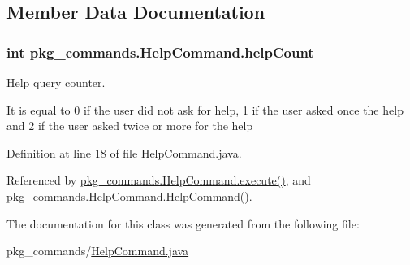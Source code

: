 \subsection{Member Data Documentation}
\hypertarget{classpkg__commands_1_1HelpCommand_a1f83dd0f92e63803f29ce29485903526}{
\subsubsection[{help\-Count}]{\setlength{\rightskip}{0pt plus 5cm}int pkg\-\_\-commands.\-Help\-Command.\-help\-Count\hspace{0.3cm}{\ttfamily [private]}}}\label{classpkg__commands_1_1HelpCommand_a1f83dd0f92e63803f29ce29485903526}


Help query counter. 

It is equal to 0 if the user did not ask for help, 1 if the user asked once the help and 2 if the user asked twice or more for the help 

Definition at line \hyperlink{HelpCommand_8java_source_l00018}{18} of file \hyperlink{HelpCommand_8java_source}{Help\-Command.\-java}.



Referenced by \hyperlink{HelpCommand_8java_source_l00033}{pkg\-\_\-commands.\-Help\-Command.\-execute()}, and \hyperlink{HelpCommand_8java_source_l00023}{pkg\-\_\-commands.\-Help\-Command.\-Help\-Command()}.



The documentation for this class was generated from the following file\-:\begin{DoxyCompactItemize}
\item 
pkg\-\_\-commands/\hyperlink{HelpCommand_8java}{Help\-Command.\-java}\end{DoxyCompactItemize}
